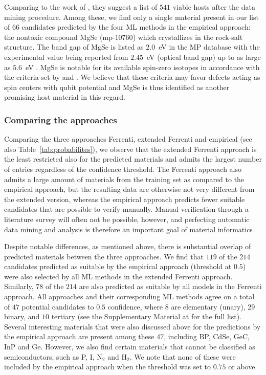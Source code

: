 \documentclass[superscriptaddress,unsortedaddress,
 amsmath,amssymb,
 aps,
]{revtex4-2}
\begin{document}
Comparing to the work of \citeauthor{Ferrenti2020} \cite{Ferrenti2020}, they suggest a list of $541$ viable hosts after the data mining procedure.  
Among these, we find only a single material present in our list of $66$ candidates predicted by the four ML methods in the empirical approach: the nontoxic compound MgSe (mp-$10760$) which crystallizes in the rock-salt structure. The band gap of MgSe is listed as $2.0$~eV in the MP database with the experimental value being reported from $2.45$~eV (optical band gap) \cite{Ubale2014} up to as large as $5.6$~eV \cite{SaumGeorge1959}. MgSe is notable for its available spin-zero isotopes in accordance with the criteria set by \citeauthor{Weber2010} \cite{Weber2010} and \citeauthor{Ferrenti2020} \cite{Ferrenti2020}. We believe that these criteria may favor defects acting as spin centers with qubit potential and MgSe is thus identified as another promising host material in this regard.   

\subsubsection*{Comparing the approaches}
Comparing the three approaches Ferrenti, extended Ferrenti and empirical (see also Table~\ref{tab:probabilites}), we observe that the extended Ferrenti approach is the least restricted also for the predicted materials and admits the largest number of entries regardless of the confidence threshold. The Ferrenti approach also admits a large amount of materials from the training set as compared to the empirical approach, but the resulting data are otherwise not very different from the extended version, whereas the empirical approach predicts fewer suitable candidates that are possible to verify manually. Manual verification through a literature survey will often not be possible, however, and perfecting automatic data mining and analysis is therefore an important goal of material informatics \cite{rickman2019}. 

Despite notable differences, as mentioned above, there is substantial overlap of predicted materials between the three approaches. 
We find that $119$ of the $214$ candidates predicted as suitable by the empirical approach (threshold at $0.5$) were also selected by all ML methods in the extended Ferrenti approach. 
Similarly, $78$ of the $214$ are also predicted as suitable by all models in the Ferrenti approach. All approaches and their corresponding ML methods agree on a total of $47$ potential candidates to $0.5$ confidence, where $8$ are elementary (unary), $29$ binary, and $10$ tertiary  
(see the Supplementary Material at \cite{supplementary} for the full list). 
Several interesting materials that were also discussed above for the predictions by the empirical approach are present among these $47$, including BP, CdSe, GeC, InP and Ge. However, we also find certain materials that cannot be classified as semiconductors, such as P, I, N$_2$ and H$_2$. We note that none of these were included by the empirical approach when the threshold was set to $0.75$ or above. 
\end{document}
